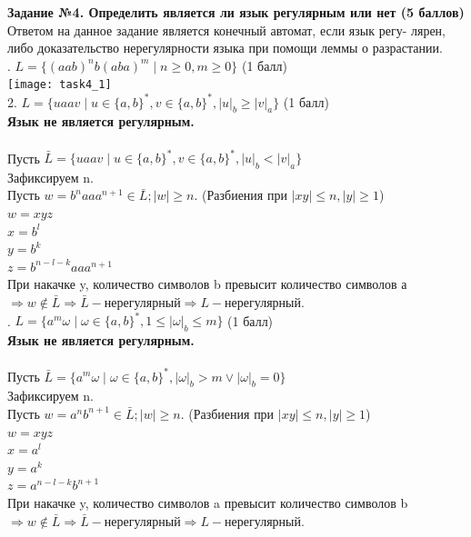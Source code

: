 \documentclass{article}
\begin{document}
\newpage
\textbf{\Large Задание №4. Определить является ли язык регулярным или нет (5 баллов)}\\
\hfill \break
\normalsize{Ответом на данное задание является конечный автомат, если язык регу-
лярен, либо доказательство нерегулярности языка при помощи леммы о разрастании.}\\
\hfill {}. \(L = \{(aab)^nb(aba)^m  \mid n \geq 0, m \geq 0\}\) (1 балл)\\
\hfill \break
\texttt{[image: task4\_1]}\\
2. \(L = \{uaav \mid u \in \{a,b\}^*, v \in \{a, b\}^*, |u|_b \geq |v|_a\}\) (1 балл)\\
\hfill \break
\normalsize \textbf{Язык не является регулярным.}\\\\
Пусть \( \bar{L} = \{uaav \mid u \in \{a,b\}^*, v \in \{a, b\}^*, |u|_b < |v|_a \}\)\\
Зафиксируем n.\\
Пусть \( w = b^naaa^{n+1} \in  \bar{L}; |w| \geq n.\) (Разбиения при \(|xy| \leq n, |y| \geq 1\))\\
 \(w = xyz\)\\
 \( x = b^l\)\\
 \( y = b^k\)\\
 \( z = b^{n-l-k}aaa^{n+1}\)\\
{При накачке y, количество символов b превысит количество символов а} \(\Rightarrow w \notin \bar{L} \Rightarrow \bar{L} - \text{нерегулярный} \Rightarrow L - \text{нерегулярный.}\)\\
\hfill {}. \(L = \{a^m\omega \mid \omega \in \{a,b\}^*, 1 \leq  |\omega|_b \leq m\}\) (1 балл)\\
\hfill \break
\normalsize \textbf{Язык не является регулярным.}\\\\
Пусть \( \bar{L} = \{a^m\omega \mid \omega \in \{a,b\}^*, |\omega|_b > m \vee  |\omega|_b = 0\}\)\\
Зафиксируем n.\\
Пусть \( w = a^nb^{n+1} \in  \bar{L}; |w| \geq n.\) (Разбиения при \(|xy| \leq n, |y| \geq 1\))\\
 \(w = xyz\)\\
 \( x = a^l\)\\
 \( y = a^k\)\\
 \( z = a^{n-l-k}b^{n+1}\)\\
{При накачке y, количество символов a превысит количество символов b} \(\Rightarrow w \notin \bar{L} \Rightarrow \bar{L} - \text{нерегулярный} \Rightarrow L - \text{нерегулярный.}\)\\\\
\end{document}

